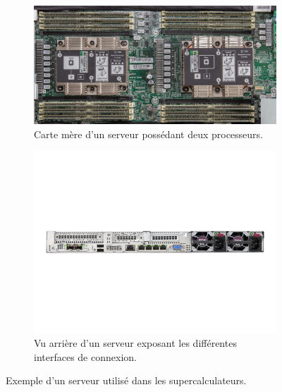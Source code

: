 \begin{enumerate}
                \begin{figure}[t!]
                    \centering
                    \begin{subfigure}[t]{0.48\textwidth}
                        \centering
                        \includegraphics[width=.9\linewidth]{images/motherboard.jpg}
                        \caption{\label{fig:motherboard}Carte mère d'un serveur possédant deux processeurs.}
                    \end{subfigure}\hfill
                \begin{subfigure}[t]{0.48\textwidth}
                        \centering
                        \includegraphics[width=\linewidth]{images/dl360_back.jpg}
                        \caption{Vu arrière d'un serveur exposant les différentes interfaces de connexion.\label{fig:dl360_back}}
                    \end{subfigure}
                    \caption{Exemple d'un serveur utilisé dans les supercalculateurs.}
                    \label{pic_pi_rect}
                \end{figure}
    

\end{enumerate}
